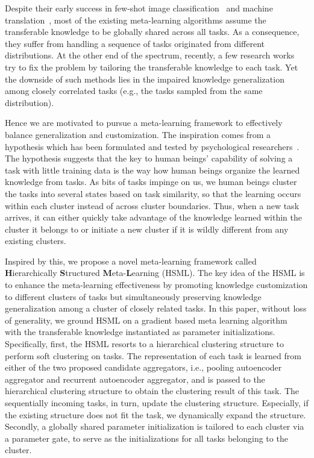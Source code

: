 \documentclass{article}
\begin{document}
Despite their early success in few-shot image classification~\cite{ravi2016optimization} and machine translation~\cite{gu2018meta}, most of the existing meta-learning algorithms assume the transferable knowledge to be globally shared across all tasks.
As a consequence, they suffer from handling a sequence of tasks originated from different distributions.
At the other end of the spectrum, recently, a few research works~\cite{finn2018probabilistic,yoon2018bayesian,lee2018gradient} try to fix the problem by tailoring the transferable knowledge to each task.
Yet the downside of such methods lies in the impaired knowledge generalization among closely correlated tasks (e.g., the tasks sampled from the same distribution). 

Hence we are motivated to pursue a meta-learning framework to effectively balance generalization and customization. 
The inspiration comes from a hypothesis which has been formulated and tested by psychological researchers~\cite{gershman2010context,gershman2014statistical}. 
The hypothesis suggests that the key to human beings' capability of solving a task with little training data is the way how human beings organize the learned knowledge from tasks.
As bits of tasks impinge on us, we human beings cluster the tasks into several states based on task similarity, so that the learning occurs within each cluster instead of across cluster boundaries.
Thus, when a new task arrives, it can either quickly take advantage of the knowledge learned within the cluster it belongs to or initiate a new cluster if it is wildly different from any existing clusters.

Inspired by this, we propose a novel meta-learning framework called \textbf{H}ierarchically \textbf{S}tructured \textbf{M}eta-\textbf{L}earning (HSML). The key idea of the HSML is to enhance the meta-learning effectiveness by
promoting knowledge customization to different clusters of tasks but simultaneously preserving knowledge generalization among a cluster of closely related tasks.
In this paper, without loss of generality, we ground HSML on a gradient based meta learning algorithm~\cite{finn2017model} with the transferable knowledge instantiated as parameter initializations. 
Specifically, first, the HSML resorts to a hierarchical clustering structure to perform soft clustering on tasks. 
The representation of each task is learned from either of the two proposed candidate aggregators, i.e., pooling autoencoder aggregator and recurrent autoencoder aggregator, and is passed to the hierarchical clustering structure to obtain the clustering result of this task.
The sequentially incoming tasks, in turn, update the clustering structure. Especially, if the existing structure does not fit the task, we dynamically expand the structure.
Secondly, a globally shared parameter initialization is tailored to each cluster via a parameter gate, to serve as the initializations for all tasks belonging to the cluster.
\end{document}
